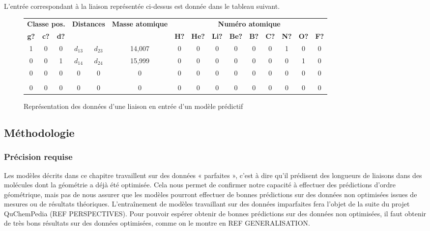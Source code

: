 \par L'entrée correspondant à la liaison représentée ci-dessus est donnée dans le tableau suivant.

\begin{figure}[!h]
	\centering


	\begin{tabular}{|c|c|c|c|c|c|c|c|c|c|c|c|c|c|c|}
		\hline
		\multicolumn{3}{|c|}{\textbf{Classe pos.}} & \multicolumn{2}{|c|}{\textbf{Distances}} & \textbf{Masse atomique} & \multicolumn{9}{|c|}{\textbf{Numéro atomique}} \\
		\textbf{g?} & \textbf{c?} & \textbf{d?} & \multicolumn{2}{|c|}{}& & \textbf{H?} & \textbf{He?} & \textbf{Li?} & \textbf{Be?} & \textbf{B? }& \textbf{C?} & \textbf{N?} & \textbf{O?} & \textbf{F?} \\ \hline
		1 & 0 & 0 & $d_{13}$ & $d_{23}$ & 14,007 & 0 & 0 & 0 & 0 & 0 & 0 & 1 & 0 & 0 \\ \hline
		0 & 0 & 1 & $d_{14}$ & $d_{24}$ & 15,999 & 0 & 0 & 0 & 0 & 0 & 0 & 0 & 1 & 0 \\ \hline
		0 & 0 & 0 & 0 & 0 & 0 & 0 & 0 & 0 & 0 & 0 & 0 & 0 & 0 & 0 \\ \hline
		\rot{... } & \rot{... } & \rot{... } & \rot{... } & \rot{... } & \rot{... } & \rot{... } & \rot{... } & \rot{... } & \rot{... } & \rot{... } & \rot{... } & \rot{... } & \rot{... } & \rot{... }  \\ \hline 
		0 & 0 & 0 & 0 & 0 & 0 & 0 & 0 & 0 & 0 & 0 & 0 & 0 & 0 & 0 \\ \hline
	\end{tabular}

	\caption{Représentation des données d'une liaison en entrée d'un modèle prédictif}
\end{figure}



\subsection{Méthodologie}

\subsubsection{Précision requise}
\par Les modèles décrits dans ce chapitre travaillent sur des données « parfaites », c'est à dire qu'il prédisent des longueurs de liaisons dans des molécules dont la géométrie a déjà été optimisée. Cela nous permet de confirmer notre capacité à effectuer des prédictions d'ordre géométrique, mais pas de nous assurer que les modèles pourront effectuer de bonnes prédictions sur des données non optimisées issues de mesures ou de résultats théoriques. L'entraînement de modèles travaillant sur des données imparfaites fera l'objet de la suite du projet QuChemPedia (REF PERSPECTIVES). Pour pouvoir espérer obtenir de bonnes prédictions sur des données non optimisées, il faut obtenir de très bons résultats sur des données optimisées, comme on le montre en REF GENERALISATION.

